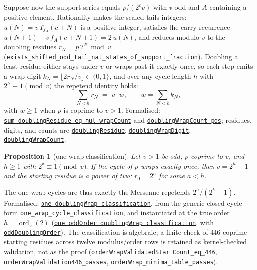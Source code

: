 \documentclass[11pt]{article}
\newcommand{\commit}{81150c1c6fdd4cd51e76d3aa0de344341e0e9e7c}
\newcommand{\repobase}{https://github.com/wcook04/plectis-lean-erdos249-257/blob/\commit}
\newcommand{\PK}{Erdos249257}
\newcommand{\lref}[3]{\href{\repobase/\PK/#1\#L#2}{\nolinkurl{#3}}}
\newcommand{\lrefx}[3]{\href{\repobase/\PK/#1\#L#2}{\nolinkurl{#3}}}
\newtheorem{proposition}[theorem]{Proposition}
\theoremstyle{definition}
\theoremstyle{remark}
\begin{document}
Suppose now the support series equals $p/(2^c v)$ with $v$ odd and $A$
containing a positive element. Rationality makes the scaled tails integers:
$u(N)=v\,T_{f_A}(c+N)$ is a positive integer, satisfies the carry recurrence
$u(N+1)+v\,f_A(c+N+1)=2\,u(N)$, and reduces modulo $v$ to the doubling
residues $r_N=p\,2^N\bmod v$
(\lrefx{RationalSupportCarrySkeleton.lean}{668}{exists_shifted_odd_tail_nat_states_of_support_fraction}).
Doubling a least residue either stays under $v$ or wraps past it exactly once,
so each step emits a wrap digit $k_N=\lfloor2r_N/v\rfloor\in\{0,1\}$, and over
any cycle length $h$ with $2^h\equiv1\pmod v$ the repetend identity holds:
\[
\sum_{N<h}r_N \;=\; v\cdot w,
\qquad
w=\sum_{N<h}k_N,
\]
with $w\ge1$ when $p$ is coprime to $v>1$. Formalised:
\lref{RationalSupportCarrySkeleton.lean}{171}{sum_doublingResidue_eq_mul_wrapCount}
and \lrefx{RationalSupportCarrySkeleton.lean}{181}{doublingWrapCount_pos};
residues, digits, and counts are
\lrefx{RationalSupportCarrySkeleton.lean}{35}{doublingResidue},
\lrefx{RationalSupportCarrySkeleton.lean}{39}{doublingWrapDigit},
\lrefx{RationalSupportCarrySkeleton.lean}{43}{doublingWrapCount}.

\begin{proposition}[one-wrap classification]\label{res:onewrap}
Let $v>1$ be odd, $p$ coprime to $v$, and $h\ge1$ with $2^h\equiv1\pmod v$.
If the cycle of $p$ wraps exactly once, then $v=2^h-1$ and the starting
residue is a power of two: $r_0=2^a$ for some $a<h$.
\end{proposition}
\noindent The one-wrap cycles are thus exactly the Mersenne repetends
$2^a/(2^h-1)$. Formalised:
\lref{RationalSupportCarrySkeleton.lean}{415}{one_doublingWrap_classification},
from the generic closed-cycle form
\lrefx{RationalSupportCarrySkeleton.lean}{353}{one_wrap_cycle_classification},
and instantiated at the true order $h=\operatorname{ord}_v(2)$
(\lrefx{RationalSupportCarrySkeleton.lean}{478}{one_oddOrder_doublingWrap_classification},
with \lrefx{RationalSupportCarrySkeleton.lean}{436}{oddDoublingOrder}). The
classification is algebraic; a finite check of $446$ coprime starting residues
across twelve modulus/order rows is retained as kernel-checked validation, not
as the proof
(\lrefx{RationalSupportCarrySkeleton.lean}{2450}{orderWrapValidatedStartCount_eq_446},
\lrefx{RationalSupportCarrySkeleton.lean}{2454}{orderWrapValidation446_passes},
\lrefx{RationalSupportCarrySkeleton.lean}{2460}{orderWrap_minima_table_passes}).
\end{document}
